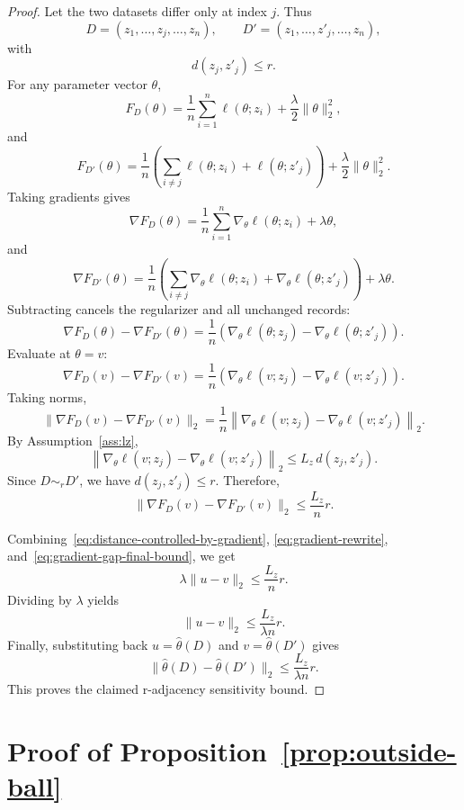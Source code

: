 \documentclass[conference,compsoc]{IEEEtran}
\begin{document}
\begin{proof}
Let the two datasets differ only at index $j$. Thus
\[
D=(z_1,\dots,z_j,\dots,z_n),
\qquad
D'=(z_1,\dots,z'_j,\dots,z_n),
\]
with
\[
d(z_j,z'_j)\le r.
\]
For any parameter vector $\theta$,
\[
F_D(\theta)
=
\frac{1}{n}\sum_{i=1}^n \ell(\theta;z_i)
+
\frac{\lambda}{2}\|\theta\|_2^2,
\]
and
\[
F_{D'}(\theta)
=
\frac{1}{n}
\left(
\sum_{i\neq j}\ell(\theta;z_i)
+
\ell(\theta;z'_j)
\right)
+
\frac{\lambda}{2}\|\theta\|_2^2.
\]
Taking gradients gives
\[
\nabla F_D(\theta)
=
\frac{1}{n}\sum_{i=1}^n \nabla_\theta \ell(\theta;z_i)
+
\lambda\theta,
\]
and
\[
\nabla F_{D'}(\theta)
=
\frac{1}{n}
\left(
\sum_{i\neq j}\nabla_\theta \ell(\theta;z_i)
+
\nabla_\theta \ell(\theta;z'_j)
\right)
+
\lambda\theta.
\]
Subtracting cancels the regularizer and all unchanged records:
\[
\nabla F_D(\theta)-\nabla F_{D'}(\theta)
=
\frac{1}{n}
\left(
\nabla_\theta \ell(\theta;z_j)
-
\nabla_\theta \ell(\theta;z'_j)
\right).
\]
Evaluate at $\theta=v$:
\[
\nabla F_D(v)-\nabla F_{D'}(v)
=
\frac{1}{n}
\left(
\nabla_\theta \ell(v;z_j)
-
\nabla_\theta \ell(v;z'_j)
\right).
\]
Taking norms,
\[
\|\nabla F_D(v)-\nabla F_{D'}(v)\|_2
=
\frac{1}{n}
\left\|
\nabla_\theta \ell(v;z_j)
-
\nabla_\theta \ell(v;z'_j)
\right\|_2.
\]
By Assumption~\ref{ass:lz},
\[
\left\|
\nabla_\theta \ell(v;z_j)
-
\nabla_\theta \ell(v;z'_j)
\right\|_2
\le
L_z\,d(z_j,z'_j).
\]
Since $D\sim_r D'$, we have $d(z_j,z'_j)\le r$. Therefore,
\begin{equation}
\label{eq:gradient-gap-final-bound}
\|\nabla F_D(v)-\nabla F_{D'}(v)\|_2
\le
\frac{L_z}{n}r.
\end{equation}

Combining~\eqref{eq:distance-controlled-by-gradient},
\eqref{eq:gradient-rewrite}, and~\eqref{eq:gradient-gap-final-bound}, we get
\[
\lambda\|u-v\|_2
\le
\frac{L_z}{n}r.
\]
Dividing by $\lambda$ yields
\[
\|u-v\|_2
\le
\frac{L_z}{\lambda n}r.
\]
Finally, substituting back $u=\hat\theta(D)$ and $v=\hat\theta(D')$ gives
\[
\|\hat\theta(D)-\hat\theta(D')\|_2
\le
\frac{L_z}{\lambda n}r.
\]
This proves the claimed r-adjacency sensitivity bound.
\end{proof}

\section{Proof of Proposition~\ref{prop:outside-ball}}
\label{app:proof-outside-ball}
\end{document}
